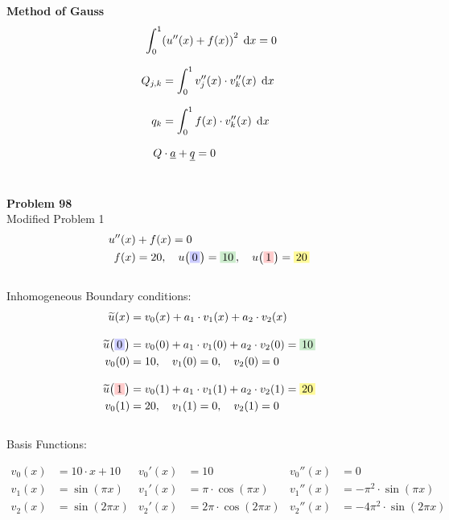 \documentclass[
final,
a4paper,
oneside,
parskip=full,
headings=standardclasses,
headings=big,
pointednumbers,
fleqn
]{scrartcl}
\newcommand{\tfillb}[1]{\tfillc[#1][blue!20]}
\newcommand{\tfillg}[1]{\tfillc[#1][Green!20]}
\newcommand{\tfilly}[1]{\tfillc[#1][yellow!40]}
\newcommand{\tfillr}[1]{\tfillc[#1][red!20]}
\newcommand*\difx{\; \mathop{}\!\mathrm{d}x}
\newcommand{\kl}[1]{{\left( #1 \right)}}
\begin{document}
    {\bf{Method of Gauss}} \\
    {\setlength{\abovedisplayskip}{-6pt}
    \setlength{\belowdisplayskip}{-12pt}
    \begin{align*}
    \int_{0}^{1}&{\kl{u''\kl{x} + f\kl{x}}^2 \difx} = 0  \\[0.25cm]
    Q_{j,k} & = \int_{0}^{1}{v_j''\kl{x} \cdot v_k''\kl{x} \difx}  \\[0.25cm]
    q_k & = \int_{0}^{1}{f\kl{x} \cdot v_k''\kl{x} \difx}   \\[0.25cm]
    Q &\cdot \uline{a} + \uline{q} = 0
    \end{align*}} \\
    
    
    \newpage
    
    {\bf{Problem 98}} \\
    Modified Problem 1 \\
    {\setlength{\abovedisplayskip}{-12pt}
    \setlength{\belowdisplayskip}{-6pt}
    \begin{align*}
    u''\kl{x} &+ f\kl{x} = 0 \\
    f\kl{x} &= 20, \quad u\kl{\tfillb{$0$}} = \tfillg{$10$} , \quad u\kl{\tfillr{$1$}} = \tfilly{$20$}
    \end{align*}} \\
    Inhomogeneous Boundary conditions: \\
    {\setlength{\abovedisplayskip}{-12pt}
    \setlength{\belowdisplayskip}{-22pt}
    \begin{align*}
    \widetilde{u}\kl{x} & = v_0\kl{x} + a_1 \cdot v_1\kl{x} + a_2 \cdot v_2\kl{x} \\[0.3cm]
    \widetilde{u}\kl{\tfillb{$0$}} & = v_0\kl{0} + a_1 \cdot v_1\kl{0} + a_2 \cdot v_2\kl{0} = \tfillg{$10$}\\
    v_0\kl{0} &= 10, \quad v_1\kl{0} = 0, \quad v_2\kl{0} = 0\\[0.3cm]
    \widetilde{u}\kl{\tfillr{$1$}} & = v_0\kl{1} + a_1 \cdot v_1\kl{1} + a_2 \cdot v_2\kl{1} = \tfilly{$20$}\\
    v_0\kl{1} &= 20, \quad v_1\kl{1} = 0, \quad v_2\kl{1} = 0\\
    \end{align*}} \\
    Basis Functions: \\
    \begin{minipage}{0.6\textwidth}
        \setlength{\abovedisplayskip}{0pt}
        \setlength{\belowdisplayskip}{-12pt}
        \begin{align*}
        v_0\kl{x} &= 10 \cdot x + 10    &v_0'\kl{x} &= 10                            &v_0''\kl{x} &= 0 \\
        v_1\kl{x} &= \sin\kl{\pi x}     &v_1'\kl{x} &= \pi \cdot \cos\kl{\pi x}      &v_1''\kl{x} &= -\pi^2 \cdot \sin\kl{\pi x}\\
        v_2\kl{x} &= \sin\kl{2 \pi x}   &v_2'\kl{x} &= 2 \pi \cdot \cos\kl{2 \pi x}  &v_2''\kl{x} &= -4 \pi^2 \cdot \sin\kl{2 \pi x}
        \end{align*}
    \end{minipage}
\end{document}
